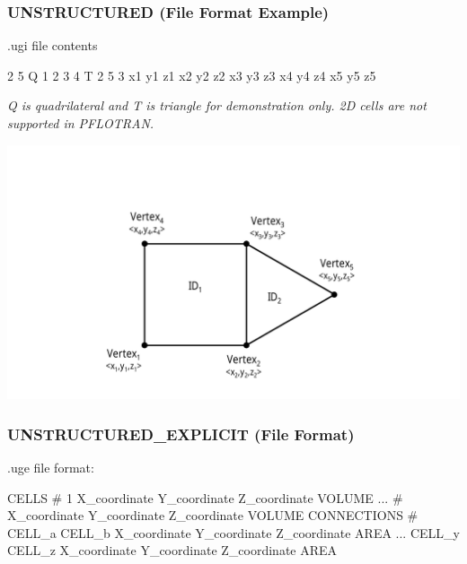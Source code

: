 \documentclass{beamer}
\begin{document}
\begin{frame}\frametitle{UNSTRUCTURED (File Format Example)}

\begin{minipage}[t]{0.48\linewidth}
\vspace{0.2in}
.ugi file contents
\begin{semiverbatim}
2 5
Q 1 2 3 4
T 2 5 3
x1 y1 z1
x2 y2 z2
x3 y3 z3
x4 y4 z4
x5 y5 z5
\end{semiverbatim}
\scriptsize
\vspace{0.1in}
\textit{Q is quadrilateral and T is triangle for demonstration only. 2D cells are not supported in PFLOTRAN.}
\end{minipage}
\hfill
\begin{minipage}[t]{0.48\linewidth}
\vspace{0.01in}
\hspace{-.75in}
\includegraphics[width=1.5\linewidth]{./fe_raw}
\end{minipage}

\end{frame}

\begin{frame}\frametitle{UNSTRUCTURED\_EXPLICIT (File Format)}
.uge file format:
\begin{semiverbatim}
  CELLS #
  1 X\_coordinate Y\_coordinate Z\_coordinate VOLUME
  ...
  # X\_coordinate Y\_coordinate Z\_coordinate VOLUME
  CONNECTIONS #
  CELL\_a CELL\_b X\_coordinate Y\_coordinate Z\_coordinate AREA
  ...
  CELL\_y CELL\_z X\_coordinate Y\_coordinate Z\_coordinate AREA
\end{semiverbatim}

\end{frame}
\end{document}
